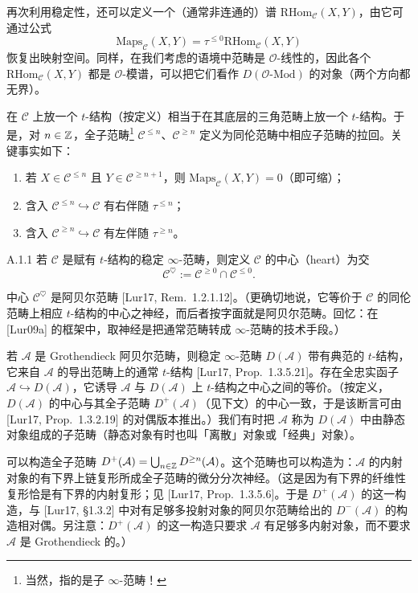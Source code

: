 再次利用稳定性，还可以定义一个（通常非连通的）谱 $\mathrm{RHom}_{\mathcal C}(X,Y)$，由它可通过公式
\[
\mathrm{Maps}_{\mathcal C}(X,Y)=\tau^{\leq0}\mathrm{RHom}_{\mathcal C}(X,Y)
\]
恢复出映射空间。同样，在我们考虑的语境中范畴是 $\mathcal O$-线性的，因此各个 $\mathrm{RHom}_{\mathcal C}(X,Y)$ 都是 $\mathcal O$-模谱，可以把它们看作 $D(\mathcal O\text{-}\mathrm{Mod})$ 的对象（两个方向都无界）。

在 $\mathcal C$ 上放一个 $t$-结构（按定义）相当于在其底层的三角范畴上放一个 $t$-结构。于是，对 $n\in\mathbb{Z}$，全子范畴\footnote{当然，指的是子 $\infty$-范畴！} $\mathcal C^{\leq n}$、$\mathcal C^{\geq n}$ 定义为同伦范畴中相应子范畴的拉回。关键事实如下：
\begin{enumerate}[label=(\arabic*)]
\item 若 $X\in\mathcal C^{\leq n}$ 且 $Y\in\mathcal C^{\geq n+1}$，则 $\mathrm{Maps}_{\mathcal C}(X,Y)=0$（即可缩）；
\item 含入 $\mathcal C^{\leq n}\hookrightarrow\mathcal C$ 有右伴随 $\tau^{\leq n}$；
\item 含入 $\mathcal C^{\geq n}\hookrightarrow\mathcal C$ 有左伴随 $\tau^{\geq n}$。
\end{enumerate}


\begin{defn}{A.1.1}\label{defn:a4-17-A-1-1}
若 $\mathcal C$ 是赋有 $t$-结构的稳定 $\infty$-范畴，则定义 $\mathcal C$ 的中心（heart）为交
\[
\mathcal C^{\heartsuit}:=\mathcal C^{\geq0}\cap\mathcal C^{\leq0}.
\]
\end{defn}

中心 $\mathcal C^{\heartsuit}$ 是阿贝尔范畴 [Lur17, Rem.~1.2.1.12]。（更确切地说，它等价于 $\mathcal C$ 的同伦范畴上相应 $t$-结构的中心之神经，而后者按字面就是阿贝尔范畴。回忆：在 [Lur09a] 的框架中，取神经是把通常范畴转成 $\infty$-范畴的技术手段。）

若 $\mathcal A$ 是 Grothendieck 阿贝尔范畴，则稳定 $\infty$-范畴 $D(\mathcal A)$ 带有典范的 $t$-结构，它来自 $\mathcal A$ 的导出范畴上的通常 $t$-结构 [Lur17, Prop.~1.3.5.21]。存在全忠实函子 $\mathcal A\hookrightarrow D(\mathcal A)$，它诱导 $\mathcal A$ 与 $D(\mathcal A)$ 上 $t$-结构之中心之间的等价。（按定义，$D(\mathcal A)$ 的中心与其全子范畴 $D^+(\mathcal A)$（见下文）的中心一致，于是该断言可由 [Lur17, Prop.~1.3.2.19] 的对偶版本推出。）我们有时把 $\mathcal A$ 称为 $D(\mathcal A)$ 中由静态对象组成的子范畴（静态对象有时也叫「离散」对象或「经典」对象）。

可以构造全子范畴 $D^+(\mathcal A)=\bigcup_{n\in\mathbb{Z}}D^{\geq n}(\mathcal A)$。这个范畴也可以构造为：$\mathcal A$ 的内射对象的有下界上链复形所成全子范畴的微分分次神经。（这是因为有下界的纤维性复形恰是有下界的内射复形；见 [Lur17, Prop.~1.3.5.6]。于是 $D^+(\mathcal A)$ 的这一构造，与 [Lur17, §1.3.2] 中对有足够多投射对象的阿贝尔范畴给出的 $D^-(\mathcal A)$ 的构造相对偶。另注意：$D^+(\mathcal A)$ 的这一构造只要求 $\mathcal A$ 有足够多内射对象，而不要求 $\mathcal A$ 是 Grothendieck 的。）

